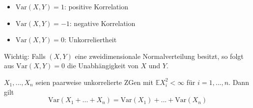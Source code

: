 \documentclass{cheat-sheet}
\newcommand{\E}{\mathbb{E}} %
\newcommand{\Var}{\mathrm{Var}} %
\newcommand{\cor}{\mathrm{Var}} %
\begin{document}
\begin{bem}
  \begin{itemize}
    \item $\cor(X, Y) = 1$: positive Korrelation
    \item $\cor(X, Y) = -1$: negative Korrelation
    \item $\cor(X, Y) = 0$: Unkorreliertheit
  \end{itemize}
\end{bem}

Wichtig: Falls $(X, Y)$ eine zweidimensionale Normalverteilung besitzt, so folgt aus $\cor(X, Y) = 0$ die Unabhängigkeit von $X$ und $Y$.

\begin{satz}
  $X_1, ..., X_n$ seien paarweise unkorrelierte ZGen mit $\E X_i^2 < \infty$ für $i = 1, ..., n$. Dann gilt
  \[ \Var(X_1 + ... + X_n) = \Var(X_1) + ... + \Var(X_n) \]
\end{satz}
\end{document}
